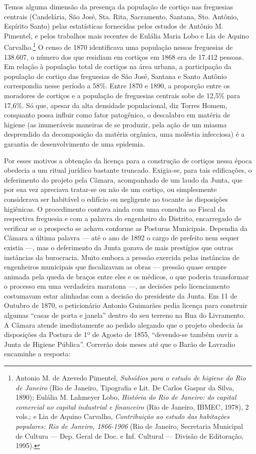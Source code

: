 Temos alguma dimensão da presença da população de cortiço nas freguesias
centrais (Candelária, São José, Sta. Rita, Sacramento, Santana, Sto.
Antônio, Espírito Santo) pelas estatísticas fornecidas pelos estudos de
Antônio M. Pimentel, e pelos trabalhos mais recentes de Eulália Maria
Lobo e Lia de Aquino Carvalho.\footnote{Antonio M. de Azevedo Pimentel,
  \textit{Subsídios para o estudo de higiene do Rio de Janeiro} (Rio de
  Janeiro, Tipografia e Lit. De Carlos Gaspar da Silva, 1890); Eulália
  M. Lahmeyer Lobo, \textit{História do Rio de Janeiro: do capital
  comercial ao capital industrial e financeiro} (Rio de Janeiro, IBMEC,
  1978), 2 vols.; e Lia de Aquino Carvalho, \textit{Contribuição ao estudo
  das habitações populares: Rio de Janeiro, 1866-1906} (Rio de Janeiro,
  Secretaria Municipal de Cultura --- Dep. Geral de Doc. e Inf. Cultural
  --- Divisão de Editoração, 1995).} O censo de 1870 identificava uma
população nessas freguesias de 138.607, o número dos que residiam em
cortiços em 1868 era de 17.412 pessoas. Em relação à população total de
cortiços na área urbana, a participação da população de cortiço das
freguesias de São José, Santana e Santo Antônio correspondia nesse
período a 58\%. Entre 1870 e 1890, a proporção entre os moradores de
cortiços e a população de freguesias centrais sobe de 12,5\% para
17,6\%. Só que, apesar da alta densidade populacional, diz Torres Homem,
conquanto possa influir como fator patogênico, o descalabro em matéria
de higiene (as inumeráveis maneiras de se produzir, pela ação de um
miasma desprendido da decomposição da matéria orgânica, uma moléstia
infecciosa) é a garantia de desenvolvimento de uma epidemia.

Por esses motivos a obtenção da licença para a construção de cortiços
nessa época obedecia a um ritual jurídico bastante truncado. Exigia-se,
para tais edificações, o deferimento do projeto pela Câmara, acompanhado
de um laudo da Junta, que por sua vez apreciava tratar-se ou não de um
cortiço, ou simplesmente considerava ser habitável o edifício ou
negligente no tocante às disposições higiênicas. O procedimento contava
ainda com uma consulta ao Fiscal da respectiva freguesia e com a palavra
do engenheiro do Distrito, encarregado de verificar se o prospecto se
achava conforme as Posturas Municipais. Dependia da Câmara a última
palavra --- até o ano de 1892 o cargo de prefeito nem sequer existia ---,
mas o deferimento da Junta gozava de mais prestígios que outras
instâncias da burocracia. Muito embora a pressão exercida pelas
instâncias de engenheiros municipais que fiscalizavam as obras ---
pressão quase sempre animada pela queda de braços entre eles e os
médicos, o que poderia transformar o processo em uma verdadeira maratona
---, as decisões pelo licenciamento costumavam estar alinhadas com a
decisão do presidente da Junta. Em 11 de Outubro de 1870, o peticionário
Antonio Guimarães pedia licença para construir algumas ``casas de porta
e janela'' dentro do seu terreno na Rua do Livramento. A Câmara atende
imediatamente ao pedido alegando que o projeto obedecia às disposições
da Postura de 1º de Agosto de 1855, ``devendo-se também ouvir a Junta de
Higiene Pública''. Correrão dois meses até que o Barão de Lavradio
encaminhe a resposta:

